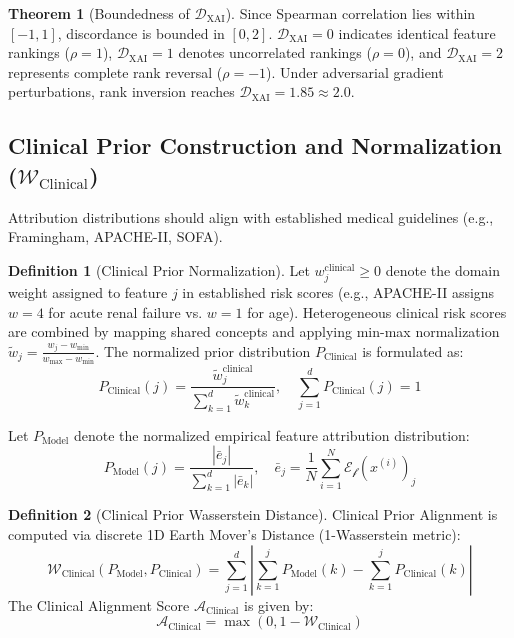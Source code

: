 \documentclass[3p,times,procedia]{elsarticle}
\theoremstyle{definition}
\newtheorem{definition}{Definition}
\newtheorem{theorem}{Theorem}
\begin{document}
\begin{theorem}[Boundedness of $\mathcal{D}_{\text{XAI}}$]
Since Spearman correlation lies within $[-1, 1]$, discordance is bounded in $[0, 2]$. $\mathcal{D}_{\text{XAI}} = 0$ indicates identical feature rankings ($\rho=1$), $\mathcal{D}_{\text{XAI}} = 1$ denotes uncorrelated rankings ($\rho=0$), and $\mathcal{D}_{\text{XAI}} = 2$ represents complete rank reversal ($\rho=-1$). Under adversarial gradient perturbations, rank inversion reaches $\mathcal{D}_{\text{XAI}} = 1.85 \approx 2.0$.
\end{theorem}

\subsection{Clinical Prior Construction and Normalization ($\mathcal{W}_{\text{Clinical}}$)}
Attribution distributions should align with established medical guidelines (e.g., Framingham, APACHE-II, SOFA).

\begin{definition}[Clinical Prior Normalization]
Let $w^{\text{clinical}}_j \ge 0$ denote the domain weight assigned to feature $j$ in established risk scores (e.g., APACHE-II assigns $w=4$ for acute renal failure vs. $w=1$ for age). Heterogeneous clinical risk scores are combined by mapping shared concepts and applying min-max normalization $\tilde{w}_j = \frac{w_j - w_{\min}}{w_{\max} - w_{\min}}$. The normalized prior distribution $P_{\text{Clinical}}$ is formulated as:
\begin{equation}
P_{\text{Clinical}}(j) = \frac{\tilde{w}^{\text{clinical}}_j}{\sum_{k=1}^d \tilde{w}^{\text{clinical}}_k}, \quad \sum_{j=1}^d P_{\text{Clinical}}(j) = 1
\end{equation}
\end{definition}

Let $P_{\text{Model}}$ denote the normalized empirical feature attribution distribution:
\begin{equation}
P_{\text{Model}}(j) = \frac{|\bar{e}_j|}{\sum_{k=1}^d |\bar{e}_k|}, \quad \bar{e}_j = \frac{1}{N} \sum_{i=1}^N \mathcal{E}_{\mathcal{f}}(x^{(i)})_j
\end{equation}

\begin{definition}[Clinical Prior Wasserstein Distance]
Clinical Prior Alignment is computed via discrete 1D Earth Mover's Distance (1-Wasserstein metric):
\begin{equation}
\mathcal{W}_{\text{Clinical}}(P_{\text{Model}}, P_{\text{Clinical}}) = \sum_{j=1}^d \left| \sum_{k=1}^j P_{\text{Model}}(k) - \sum_{k=1}^j P_{\text{Clinical}}(k) \right|
\end{equation}
The Clinical Alignment Score $\mathcal{A}_{\text{Clinical}}$ is given by:
\begin{equation}
\mathcal{A}_{\text{Clinical}} = \max\left(0, 1 - \mathcal{W}_{\text{Clinical}}\right)
\end{equation}
\end{definition}
\end{document}
